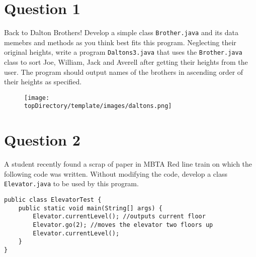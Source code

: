 %
%
%
%

\section*{Question 1}
Back to Dalton Brothers! Develop a simple class \texttt{Brother.java} and its data memebrs and methods as you think best fits this program. Neglecting their original heights, write a program \texttt{Daltons3.java} that uses the \texttt{Brother.java} class to sort Joe, William, Jack and Averell after getting their heights from the user. The program should output names of the brothers in ascending order of their heights as specified.

\begin{figure}[H]\centering
\texttt{[image: \\topDirectory/template/images/daltons.png]}
\end{figure}

\section*{Question 2}
A student recently found a scrap of paper in MBTA Red line train on which the following code was written. Without modifying the code, develop a class \texttt{Elevator.java} to be used by this program.
\lstset{language=java}
\begin{lstlisting}
public class ElevatorTest {
	public static void main(String[] args) {
		Elevator.currentLevel(); //outputs current floor
		Elevator.go(2); //moves the elevator two floors up
		Elevator.currentLevel();
	}
}
\end{lstlisting}

